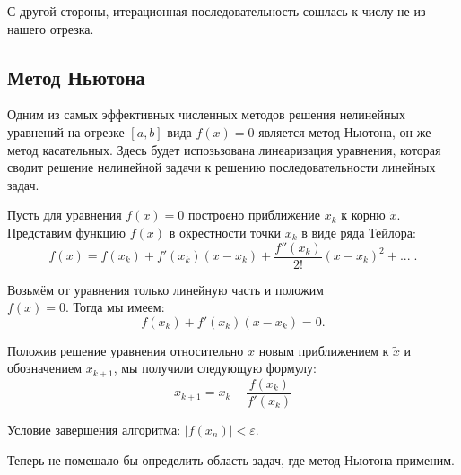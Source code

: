 \documentclass[../main.tex]{subfile}
\begin{document}
\begin{example}

	С другой стороны, итерационная последовательность сошлась к числу не из
	нашего отрезка.
\end{example}

\subsection{Метод Ньютона}

Одним из самых эффективных численных методов решения нелинейных уравнений на
отрезке $[a,b]$ вида $f(x)=0$ является метод Ньютона, он же метод касательных.
Здесь будет испозьзована линеаризация уравнения, которая сводит решение
нелинейной задачи к решению последовательности линейных задач.

\begin{algorithm}\label{eq:newton_iteration}
	Пусть для уравнения $f(x)=0$ построено приближение $x_k$ к корню
	$\widetilde{x}$. Представим функцию $f(x)$ в окрестности точки $x_k$ в
	виде ряда Тейлора:
	\[f(x)=f(x_k)+f'(x_k)(x-x_k)+\frac{f''(x_k)}{2!}(x-x_k)^2+...\;.\]

	Возьмём от уравнения только линейную часть и положим \\
	$f(x)=0$. Тогда мы имеем:
	\[f(x_k)+f'(x_k)(x-x_k)=0.\]

	Положив решение уравнения относительно $x$ новым приближением к
	$\widetilde{x}$ и обозначением $x_{k+1}$, мы получили следующую формулу:
	\[\boxed{x_{k+1}=x_k-\frac{f(x_k)}{f'(x_k)}}\]

	Условие завершения алгоритма: $|f(x_n)|<\varepsilon$.
\end{algorithm}

Теперь не помешало бы определить область задач, где метод Ньютона применим.
\end{document}
